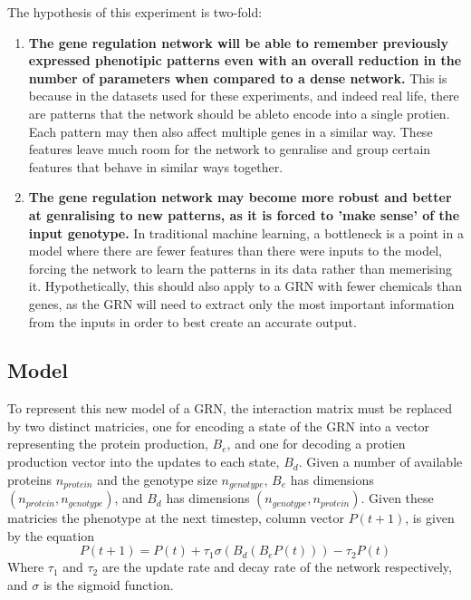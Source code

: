 \documentclass[twocolumn,a4paper]{article}
\begin{document}
    The hypothesis of this experiment is two-fold:
    \begin{enumerate}
        \item \textbf{The gene regulation network will be able to remember previously expressed phenotipic patterns even with an overall reduction in the number of parameters when compared to a dense network.} This is because in the datasets used for these experiments, and indeed real life, there are patterns that the network should be ableto encode into a single protien. Each pattern may then also affect multiple genes in a similar way. These features leave much room for the network to genralise and group certain features that behave in similar ways together.
        \item \textbf{The gene regulation network may become more robust and better at genralising to new patterns, as it is forced to 'make sense' of the input genotype.} In traditional machine learning, a bottleneck is a point in a model where there are fewer features than there were inputs to the model, forcing the network to learn the patterns in its data rather than memerising it. Hypothetically, this should also apply to a GRN with fewer chemicals than genes, as the GRN will need to extract only the most important information from the inputs in order to best create an accurate output.
    \end{enumerate}

    \subsection{Model}
    To represent this new model of a GRN, the interaction matrix must be replaced by two distinct matricies, one for encoding a state of the GRN into a vector representing the protein production, $B_e$, and one for decoding a protien production vector into the updates to each state, $B_d$. Given a number of available proteins $n_{protein}$ and the genotype size $n_{genotype}$, $B_e$ has dimensions $(n_{protein},n_{genotype})$, and $B_d$ has dimensions $(n_{genotype},n_{protein})$. Given these matricies the phenotype at the next timestep, column vector $P(t+1)$, is given by the equation
    \begin{equation}
        P(t+1) = P(t) + \tau_1 \sigma (B_d (B_e P(t))) - \tau_2 P(t)
    \end{equation}
    Where $\tau_1$ and $\tau_2$ are the update rate and decay rate of the network respectively, and $\sigma$ is the sigmoid function.
\end{document}
